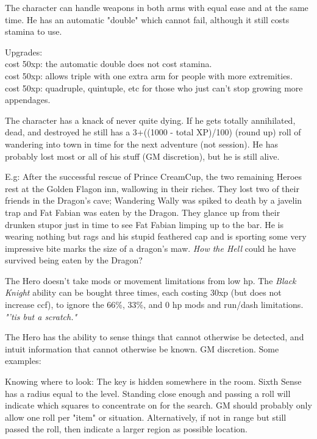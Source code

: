  The character can handle weapons in both arms with equal ease and at the same time. He has an automatic "double" which cannot fail, although it still costs stamina to use.

Upgrades:\\
cost 50xp: the automatic double does not cost stamina. \\
cost 50xp: allows triple with one extra arm for people with more extremities. \\
cost 50xp: quadruple, quintuple, etc for those who just can't stop growing more appendages.


 The character has a knack of never quite dying. If he gets totally annihilated, dead, and destroyed he still has a 3+((1000 - total XP)/100) (round up) roll of wandering into town in time for the next adventure (not session). He has probably lost most or all of his stuff (GM discretion), but he is still alive.

E.g: After the successful rescue of Prince CreamCup, the two remaining Heroes rest at the Golden Flagon inn, wallowing in their riches. They lost two of their friends in the Dragon's cave; Wandering Wally was spiked to death by a javelin trap and Fat Fabian was eaten by the Dragon. They glance up from their drunken stupor just in time to see Fat Fabian limping up to the bar. He is wearing nothing but rags and his stupid feathered cap and is sporting some very impressive bite marks the size of a dragon's maw. \emph{How the Hell} could he have survived being eaten by the Dragon?


 The Hero doesn't take mods or movement limitations from low hp. The \emph{Black Knight} ability can be bought three times, each costing 30xp (but does not increase ccf), to ignore the 66\%, 33\%, and 0 hp mods and run/dash limitations. \emph{"'tis but a scratch."}


 The Hero has the ability to sense things that cannot otherwise be detected, and intuit information that cannot otherwise be known. GM discretion. Some examples:

Knowing where to look: The key is hidden somewhere in the room. Sixth Sense has a radius equal to the level. Standing close enough and passing a roll will indicate which squares to concentrate on for the search. GM should probably only allow one roll per "item" or situation. Alternatively, if not in range but still passed the roll, then indicate a larger region as possible location.

